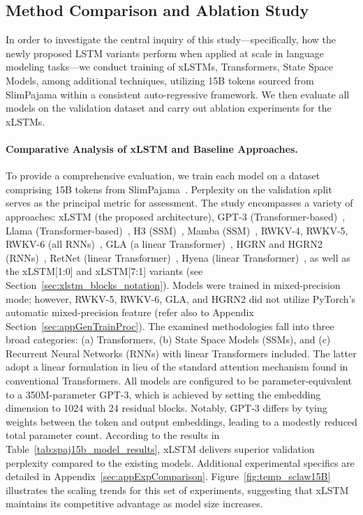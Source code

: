 \subsection{Method Comparison and Ablation Study}
\label{sec:ExpComparison}

In order to investigate the central inquiry of this study—specifically, how the newly proposed LSTM variants perform when applied at scale in language modeling tasks—we conduct training of xLSTMs, Transformers, State Space Models, among additional techniques, utilizing 15B tokens sourced from SlimPajama within a consistent auto-regressive framework. We then evaluate all models on the validation dataset and carry out ablation experiments for the xLSTMs.

\paragraph{Comparative Analysis of xLSTM and Baseline Approaches.} To provide a comprehensive evaluation, we train each model on a dataset comprising 15B tokens from SlimPajama~\citep{Soboleva:23}. Perplexity on the validation split serves as the principal metric for assessment. The study encompasses a variety of approaches: xLSTM (the proposed architecture), GPT-3 (Transformer-based)~\citep{Brown:20short}, Llama (Transformer-based)~\citep{Touvron:23arxiv}, H3 (SSM)~\citep{Fu:23}, Mamba (SSM)~\citep{Gu:24arxiv}, RWKV-4, RWKV-5, RWKV-6 (all RNNs)~\citep{Peng:23arxivshort, Peng:24arxivshort}, GLA (a linear Transformer)~\citep{Yang:23arxiv}, HGRN and HGRN2 (RNNs)~\citep{Qin:23, Qin:24arxiv}, RetNet (linear Transformer)~\citep{Sun:23arxiv}, Hyena (linear Transformer)~\citep{Poli:23}, as well as the xLSTM[1:0] and xLSTM[7:1] variants (see Section~\ref{sec:xlstm_blocks_notation}). 
Models were trained in mixed-precision mode; however, RWKV-5, RWKV-6, GLA, and HGRN2 did not utilize PyTorch’s automatic mixed-precision feature (refer also to Appendix Section~\ref{sec:appGenTrainProc}).
The examined methodologies fall into three broad categories: (a) Transformers, (b) State Space Models (SSMs), and (c) Recurrent Neural Networks (RNNs) with linear Transformers included. The latter adopt a linear formulation in lieu of the standard attention mechanism found in conventional Transformers. All models are configured to be parameter-equivalent to a 350M-parameter GPT-3, which is achieved by setting the embedding dimension to 1024 with 24 residual blocks. Notably, GPT-3 differs by tying weights between the token and output embeddings, leading to a modestly reduced total parameter count. According to the results in Table~\ref{tab:spaj15b_model_results}, xLSTM delivers superior validation perplexity compared to the existing models. Additional experimental specifics are detailed in Appendix~\ref{sec:appExpComparison}. 
Figure~\ref{fig:temp_sclaw15B} illustrates the scaling trends for this set of experiments, suggesting that xLSTM maintains its competitive advantage as model size increases.

